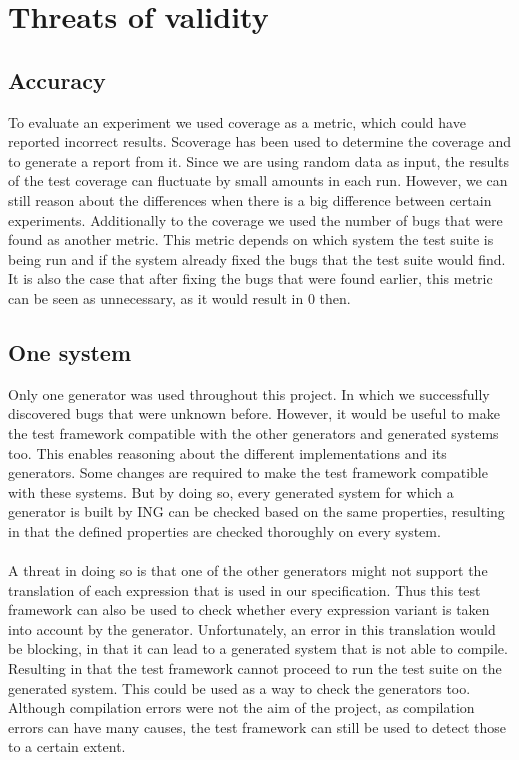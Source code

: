 \section{Threats of validity}


\subsection*{Accuracy}
To evaluate an experiment we used coverage as a metric, which could have reported incorrect results. Scoverage has been used to determine the coverage and to generate a report from it. Since we are using random data as input, the results of the test coverage can fluctuate by small amounts in each run. However, we can still reason about the differences when there is a big difference between certain experiments. Additionally to the coverage we used the number of bugs that were found as another metric. This metric depends on which system the test suite is being run and if the system already fixed the bugs that the test suite would find. It is also the case that after fixing the bugs that were found earlier, this metric can be seen as unnecessary, as it would result in 0 then.

\subsection*{One system}
Only one generator was used throughout this project. In which we successfully discovered bugs that were unknown before. However, it would be useful to make the test framework compatible with the other generators and generated systems too. This enables reasoning about the different implementations and its generators. Some changes are required to make the test framework compatible with these systems. But by doing so, every generated system for which a generator is built by ING can be checked based on the same properties, resulting in that the defined properties are checked thoroughly on every system.\\
\\
A threat in doing so is that one of the other generators might not support the translation of each expression that is used in our specification. Thus this test framework can also be used to check whether every expression variant is taken into account by the generator. Unfortunately, an error in this translation would be blocking, in that it can lead to a generated system that is not able to compile. Resulting in that the test framework cannot proceed to run the test suite on the generated system. This could be used as a way to check the generators too. Although compilation errors were not the aim of the project, as compilation errors can have many causes, the test framework can still be used to detect those to a certain extent.






